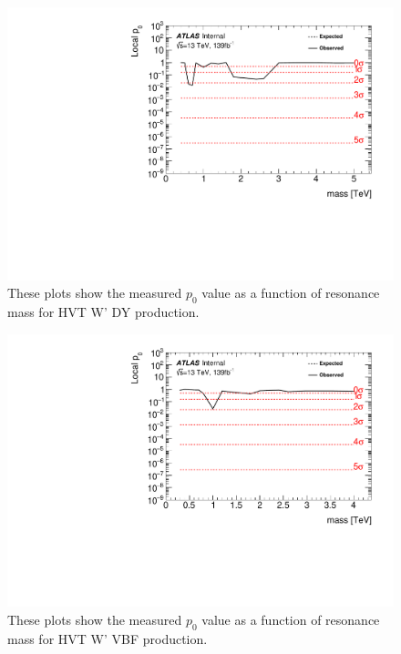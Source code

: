 \begin{figure}[h!]
  \centering
  \includegraphics[width=\hsize]{figures/results/pvalues/fixed_pvalues/hvtwz_pvalue.pdf}
 \caption{These plots show the measured $p_{0}$ value as a function of resonance mass for HVT W' DY production.} 
  \label{fig:discov_hvtwz}
\end{figure} 
\FloatBarrier

\begin{figure}[h!]
  \centering
  \includegraphics[width=\hsize]{figures/results/pvalues/fixed_pvalues/hvtwzvbf_pvalue.pdf}
 \caption{These plots show the measured $p_{0}$ value as a function of resonance mass for HVT W' VBF production.} 
  \label{fig:discov_hvtwzvbf}
\end{figure} 
\FloatBarrier


